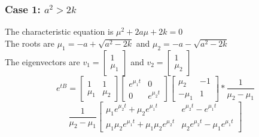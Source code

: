 \documentclass{article}
\begin{document}
\subsubsection*{Case 1: $a^2 > 2k$}
The characteristic equation is $\mu^2 + 2a\mu + 2k = 0$\\
The roots are $\mu_1 = -a + \sqrt{a^2 - 2k}$ and $\mu_2 = -a - \sqrt{a^2 - 2k}$\\
The eigenvectors are $v_1 = \begin{bmatrix}
    1 \\
    \mu_1
\end{bmatrix}$ and $v_2 = \begin{bmatrix}
    1 \\
    \mu_2
\end{bmatrix}$\\
$$e^{tB} = \begin{bmatrix}
    1 & 1\\
    \mu_1 & \mu_2
\end{bmatrix} \begin{bmatrix}
    e^{\mu_1 t} & 0\\
    0 & e^{\mu_2 t}
\end{bmatrix}  \begin{bmatrix}
    \mu_2 & -1\\
    -\mu_1 & 1
\end{bmatrix} * \frac{1}{\mu_2 - \mu_1}$$
$$\frac{1}{\mu_2-\mu_1}\begin{bmatrix}
    \mu_1e^{\mu_2 t}  + \mu_2e^{\mu_1 t} & e^{\mu_2 t} - e^{\mu_1 t}\\
    \mu_1\mu_2e^{\mu_1 t} + \mu_1\mu_2e^{\mu_2 t} & \mu_2e^{\mu_2 t}-\mu_1e^{\mu_1 t}
\end{bmatrix}
$$
\end{document}
